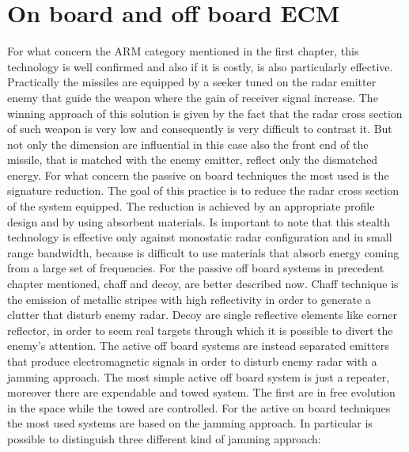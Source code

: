 \documentclass[12pt]{report}
\begin{document}
\section{On board and off board ECM}
 For what concern the ARM category mentioned in the first chapter, this technology is well confirmed and also if it is costly, is also particularly effective. Practically the missiles are equipped by a seeker tuned on the radar emitter enemy that guide the weapon where the gain of receiver signal increase. The winning approach of this solution is  given by the fact that the radar cross section of such weapon is very low and consequently is very difficult to contrast it. But not only the dimension are influential in this case also the front end of the missile, that is matched with the enemy emitter, reflect only the dismatched energy. \newline For what concern the passive on board techniques the most used is the signature reduction. The goal of this practice is to reduce the radar cross section of the system equipped. The reduction is achieved by an appropriate profile design and by using absorbent materials. Is important to note that this stealth technology is effective only against monostatic radar configuration and in small range bandwidth, because is difficult to use materials that absorb energy coming from a large set of frequencies. \newline For the passive off board systems in precedent chapter mentioned, chaff and decoy, are better described now. Chaff technique is the emission of metallic stripes with high reflectivity in order to generate a clutter that disturb enemy radar. Decoy are single reflective elements like corner reflector, in order to seem real targets through which it is possible to divert the enemy's attention. \newline The active off board systems are instead separated emitters that produce electromagnetic signals in order to disturb enemy radar  with a jamming approach. The most simple active off board system is just a repeater, moreover there are expendable and towed system. The first are in free evolution in the space while the towed are controlled. \newline For the active on board techniques the most used systems are based on the jamming approach. In particular is possible to distinguish three different kind of jamming approach:
\end{document}
